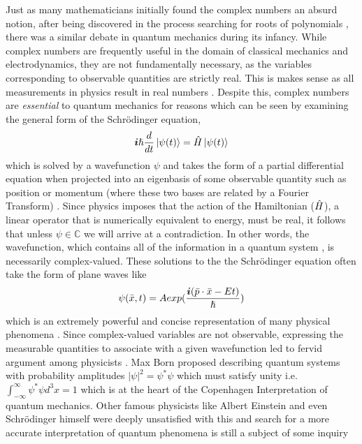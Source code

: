 \documentclass[12pt]{article}
\def\C{\mathbb C}
\begin{document}
Just as many mathematicians initially found the complex numbers an absurd notion, after being discovered in the process searching for roots of polynomials \cite{Needham}, there was a similar debate in quantum mechanics during its infancy. While complex numbers are frequently useful in the domain of classical mechanics and electrodynamics, they are not fundamentally necessary, as the variables corresponding to observable quantities are strictly real. This is makes sense as all measurements in physics result in real numbers \cite{MIT}. Despite this, complex numbers are \emph{essential} to quantum mechanics for reasons which can be seen by examining the general form of the Schr\"{o}dinger equation,
\begin{equation}
\boldsymbol{i}\hslash \frac{d}{dt} \ket{\psi(t)} = \Hat{H} \ket{\psi(t)}
\end{equation} 
which is solved by a wavefunction $\psi$ and takes the form of a partial differential equation when projected into an eigenbasis of some observable quantity such as position or momentum (where these two bases are related by a Fourier Transform) \cite{Shankar}. Since physics imposes that the action of the Hamiltonian ($\Hat{H}$), a linear operator that is numerically equivalent to energy, must be real, it follows that unless $\psi \in \C$ we will arrive at a contradiction. In other words, the wavefunction, which contains all of the information in a quantum system \cite{Ralston}, is necessarily complex-valued. These solutions to the the Schr\"{o}dinger equation often take the form of plane waves like \begin{equation}
\psi(\Bar{x},t) = Aexp(\frac{\boldsymbol{i}(\Bar{p}\cdot \Bar{x} - Et)}{\hslash})
\end{equation} 
which is an extremely powerful and concise representation of many physical phenomena \cite{Feynman}.   Since complex-valued variables are not observable, expressing the measurable quantities to associate with a given wavefunction led to fervid argument among physicists \cite{MIT}. Max Born proposed describing quantum systems with probability amplitudes $|\psi|^2 = \psi^*\psi$ which must satisfy unity i.e. $\int_{-\infty}^{\infty} \psi^*\psi d^3x = 1$ which is at the heart of the Copenhagen Interpretation of quantum mechanics. Other famous physicists like Albert Einstein and even Schr\"{o}dinger himself were deeply unsatisfied with this and search for a more accurate interpretation of quantum phenomena is still a subject of some inquiry \cite{Griffiths}
\end{document}
